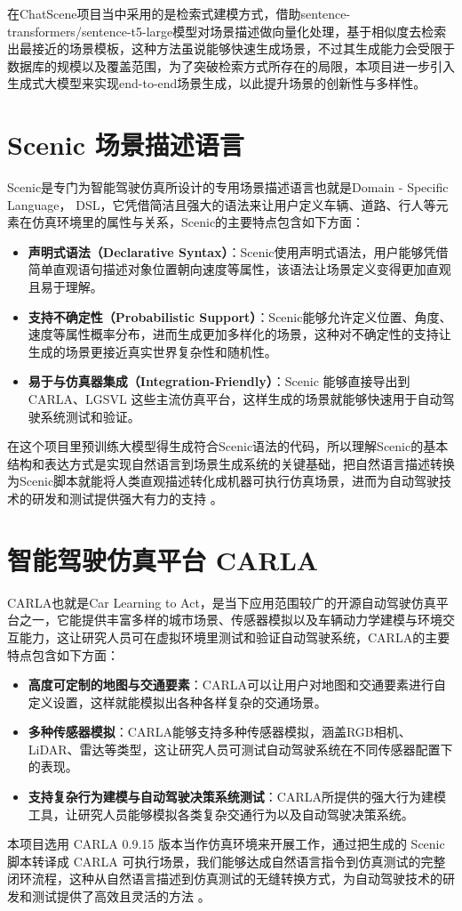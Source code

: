 在ChatScene项目当中采用的是检索式建模方式，借助sentence-transformers/sentence-t5-large模型对场景描述做向量化处理，基于相似度去检索出最接近的场景模板，这种方法虽说能够快速生成场景，不过其生成能力会受限于数据库的规模以及覆盖范围，为了突破检索方式所存在的局限，本项目进一步引入生成式大模型来实现end-to-end场景生成，以此提升场景的创新性与多样性。

\section{Scenic 场景描述语言}
Scenic是专门为智能驾驶仿真所设计的专用场景描述语言也就是Domain - Specific Language， DSL，它凭借简洁且强大的语法来让用户定义车辆、道路、行人等元素在仿真环境里的属性与关系，Scenic的主要特点包含如下方面：
\begin{itemize}
	\item \textbf{声明式语法（Declarative Syntax）}：Scenic使用声明式语法，用户能够凭借简单直观语句描述对象位置朝向速度等属性，该语法让场景定义变得更加直观且易于理解。
	\item \textbf{支持不确定性（Probabilistic Support）}：Scenic能够允许定义位置、角度、速度等属性概率分布，进而生成更加多样化的场景，这种对不确定性的支持让生成的场景更接近真实世界复杂性和随机性。
	\item \textbf{易于与仿真器集成（Integration-Friendly）}：Scenic 能够直接导出到 CARLA、LGSVL 这些主流仿真平台，这样生成的场景就能够快速用于自动驾驶系统测试和验证。
\end{itemize}

在这个项目里预训练大模型得生成符合Scenic语法的代码，所以理解Scenic的基本结构和表达方式是实现自然语言到场景生成系统的关键基础，把自然语言描述转换为Scenic脚本就能将人类直观描述转化成机器可执行仿真场景，进而为自动驾驶技术的研发和测试提供强大有力的支持 。

\section{智能驾驶仿真平台 CARLA}
CARLA也就是Car Learning to Act，是当下应用范围较广的开源自动驾驶仿真平台之一，它能提供丰富多样的城市场景、传感器模拟以及车辆动力学建模与环境交互能力，这让研究人员可在虚拟环境里测试和验证自动驾驶系统，CARLA的主要特点包含如下方面：
\begin{itemize}
	\item \textbf{高度可定制的地图与交通要素}：CARLA可以让用户对地图和交通要素进行自定义设置，这样就能模拟出各种各样复杂的交通场景。
	\item \textbf{多种传感器模拟}：CARLA能够支持多种传感器模拟，涵盖RGB相机、LiDAR、雷达等类型，这让研究人员可测试自动驾驶系统在不同传感器配置下的表现。
	\item \textbf{支持复杂行为建模与自动驾驶决策系统测试}：CARLA所提供的强大行为建模工具，让研究人员能够模拟各类复杂交通行为以及自动驾驶决策系统。
\end{itemize}
本项目选用 CARLA 0.9.15 版本当作仿真环境来开展工作，通过把生成的 Scenic 脚本转译成 CARLA 可执行场景，我们能够达成自然语言指令到仿真测试的完整闭环流程，这种从自然语言描述到仿真测试的无缝转换方式，为自动驾驶技术的研发和测试提供了高效且灵活的方法 。

